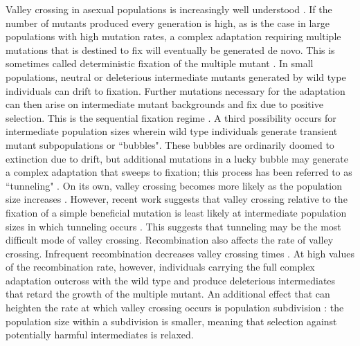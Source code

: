 \documentclass[10pt,twocolumn,twoside]{gsajnl}
\begin{document}
\begin{spacing}{1.5}
Valley crossing in asexual populations is increasingly well understood \citep{weissman_2009}.
If the number of mutants produced every generation is high, as is the case in large populations with high mutation rates, a complex adaptation requiring multiple mutations that is destined to fix will eventually be generated de novo.
This is sometimes called deterministic fixation of the multiple mutant \citep{weissman_2009}.
In small populations, neutral or deleterious intermediate mutants generated by wild type individuals can drift to fixation. Further mutations necessary for the adaptation can then arise on intermediate mutant backgrounds and fix due to positive selection.
This is the sequential fixation regime \citep{weissman_2009}.
A third possibility occurs for intermediate population sizes wherein wild type individuals generate transient mutant subpopulations or ``bubbles".
These bubbles are ordinarily doomed to extinction due to drift, but additional mutations in a lucky bubble may generate a complex adaptation that sweeps to fixation; this process has been referred to as ``tunneling" \citep{iwasa_2004, weissman_2009}.
On its own, valley crossing becomes more likely as the population size increases \citep{weissman_2009}. However, recent work suggests that valley crossing relative to the fixation of a simple beneficial mutation is least likely at intermediate population sizes in which tunneling occurs \citet{ochs_2015}. This suggests that tunneling may be the most difficult mode of valley crossing. 
Recombination also affects the rate of valley crossing.
Infrequent recombination decreases valley crossing times \citep{weissman_2010}.
At high values of the recombination rate, however, individuals carrying the full complex adaptation outcross with the wild type and produce deleterious intermediates that retard the growth of the multiple mutant.
An additional effect that can heighten the rate at which valley crossing occurs is population subdivision \citep{Bitbol:Schwab:2014}: the population size within a subdivision is smaller, meaning that selection against potentially harmful intermediates is relaxed.


\end{spacing}
\end{document}
